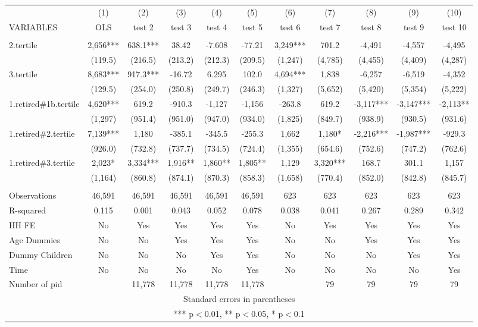 \begin{tabular}{lcccccccccc} \hline
 & (1) & (2) & (3) & (4) & (5) & (6) & (7) & (8) & (9) & (10) \\
VARIABLES & OLS & test 2 & test 3 & test 4 & test 5 & test 6 & test 7 & test 8 & test 9 & test 10 \\ \hline
 &  &  &  &  &  &  &  &  &  &  \\
2.tertile & 2,656*** & 638.1*** & 38.42 & -7.608 & -77.21 & 3,249*** & 701.2 & -4,491 & -4,557 & -4,495 \\
 & (119.5) & (216.5) & (213.2) & (212.3) & (209.5) & (1,247) & (4,785) & (4,455) & (4,409) & (4,287) \\
3.tertile & 8,683*** & 917.3*** & -16.72 & 6.295 & 102.0 & 4,694*** & 1,838 & -6,257 & -6,519 & -4,352 \\
 & (129.5) & (254.0) & (250.8) & (249.7) & (246.3) & (1,327) & (5,652) & (5,420) & (5,354) & (5,222) \\
1.retired\#1b.tertile & 4,620*** & 619.2 & -910.3 & -1,127 & -1,156 & -263.8 & 619.2 & -3,117*** & -3,147*** & -2,113** \\
 & (1,297) & (951.4) & (951.0) & (947.0) & (934.0) & (1,825) & (849.7) & (938.9) & (930.5) & (931.6) \\
1.retired\#2.tertile & 7,139*** & 1,180 & -385.1 & -345.5 & -255.3 & 1,662 & 1,180* & -2,216*** & -1,987*** & -929.3 \\
 & (926.0) & (732.8) & (737.7) & (734.5) & (724.4) & (1,355) & (654.6) & (752.6) & (747.2) & (762.6) \\
1.retired\#3.tertile & 2,023* & 3,334*** & 1,916** & 1,860** & 1,805** & 1,129 & 3,320*** & 168.7 & 301.1 & 1,157 \\
 & (1,164) & (860.8) & (874.1) & (870.3) & (858.3) & (1,658) & (770.4) & (852.0) & (842.8) & (845.7) \\
 &  &  &  &  &  &  &  &  &  &  \\
Observations & 46,591 & 46,591 & 46,591 & 46,591 & 46,591 & 623 & 623 & 623 & 623 & 623 \\
R-squared & 0.115 & 0.001 & 0.043 & 0.052 & 0.078 & 0.038 & 0.041 & 0.267 & 0.289 & 0.342 \\
HH FE & No & Yes & Yes & Yes & Yes & No & Yes & Yes & Yes & Yes \\
Age Dummies & No & No & Yes & Yes & Yes & No & No & Yes & Yes & Yes \\
Dummy Children & No & No & No & Yes & Yes & No & No & No & Yes & Yes \\
Time & No & No & No & No & Yes & No & No & No & No & Yes \\
 Number of pid &  & 11,778 & 11,778 & 11,778 & 11,778 &  & 79 & 79 & 79 & 79 \\ \hline
\multicolumn{11}{c}{ Standard errors in parentheses} \\
\multicolumn{11}{c}{ *** p$<$0.01, ** p$<$0.05, * p$<$0.1} \\
\end{tabular}
